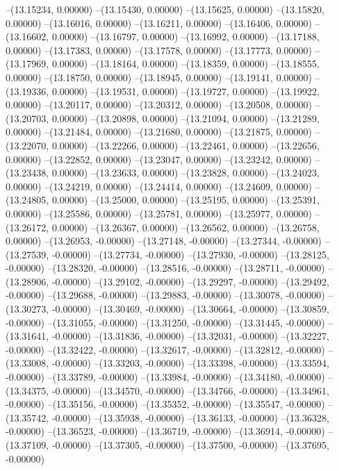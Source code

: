 --(13.15234, 0.00000)
--(13.15430, 0.00000)
--(13.15625, 0.00000)
--(13.15820, 0.00000)
--(13.16016, 0.00000)
--(13.16211, 0.00000)
--(13.16406, 0.00000)
--(13.16602, 0.00000)
--(13.16797, 0.00000)
--(13.16992, 0.00000)
--(13.17188, 0.00000)
--(13.17383, 0.00000)
--(13.17578, 0.00000)
--(13.17773, 0.00000)
--(13.17969, 0.00000)
--(13.18164, 0.00000)
--(13.18359, 0.00000)
--(13.18555, 0.00000)
--(13.18750, 0.00000)
--(13.18945, 0.00000)
--(13.19141, 0.00000)
--(13.19336, 0.00000)
--(13.19531, 0.00000)
--(13.19727, 0.00000)
--(13.19922, 0.00000)
--(13.20117, 0.00000)
--(13.20312, 0.00000)
--(13.20508, 0.00000)
--(13.20703, 0.00000)
--(13.20898, 0.00000)
--(13.21094, 0.00000)
--(13.21289, 0.00000)
--(13.21484, 0.00000)
--(13.21680, 0.00000)
--(13.21875, 0.00000)
--(13.22070, 0.00000)
--(13.22266, 0.00000)
--(13.22461, 0.00000)
--(13.22656, 0.00000)
--(13.22852, 0.00000)
--(13.23047, 0.00000)
--(13.23242, 0.00000)
--(13.23438, 0.00000)
--(13.23633, 0.00000)
--(13.23828, 0.00000)
--(13.24023, 0.00000)
--(13.24219, 0.00000)
--(13.24414, 0.00000)
--(13.24609, 0.00000)
--(13.24805, 0.00000)
--(13.25000, 0.00000)
--(13.25195, 0.00000)
--(13.25391, 0.00000)
--(13.25586, 0.00000)
--(13.25781, 0.00000)
--(13.25977, 0.00000)
--(13.26172, 0.00000)
--(13.26367, 0.00000)
--(13.26562, 0.00000)
--(13.26758, 0.00000)
--(13.26953, -0.00000)
--(13.27148, -0.00000)
--(13.27344, -0.00000)
--(13.27539, -0.00000)
--(13.27734, -0.00000)
--(13.27930, -0.00000)
--(13.28125, -0.00000)
--(13.28320, -0.00000)
--(13.28516, -0.00000)
--(13.28711, -0.00000)
--(13.28906, -0.00000)
--(13.29102, -0.00000)
--(13.29297, -0.00000)
--(13.29492, -0.00000)
--(13.29688, -0.00000)
--(13.29883, -0.00000)
--(13.30078, -0.00000)
--(13.30273, -0.00000)
--(13.30469, -0.00000)
--(13.30664, -0.00000)
--(13.30859, -0.00000)
--(13.31055, -0.00000)
--(13.31250, -0.00000)
--(13.31445, -0.00000)
--(13.31641, -0.00000)
--(13.31836, -0.00000)
--(13.32031, -0.00000)
--(13.32227, -0.00000)
--(13.32422, -0.00000)
--(13.32617, -0.00000)
--(13.32812, -0.00000)
--(13.33008, -0.00000)
--(13.33203, -0.00000)
--(13.33398, -0.00000)
--(13.33594, -0.00000)
--(13.33789, -0.00000)
--(13.33984, -0.00000)
--(13.34180, -0.00000)
--(13.34375, -0.00000)
--(13.34570, -0.00000)
--(13.34766, -0.00000)
--(13.34961, -0.00000)
--(13.35156, -0.00000)
--(13.35352, -0.00000)
--(13.35547, -0.00000)
--(13.35742, -0.00000)
--(13.35938, -0.00000)
--(13.36133, -0.00000)
--(13.36328, -0.00000)
--(13.36523, -0.00000)
--(13.36719, -0.00000)
--(13.36914, -0.00000)
--(13.37109, -0.00000)
--(13.37305, -0.00000)
--(13.37500, -0.00000)
--(13.37695, -0.00000)
